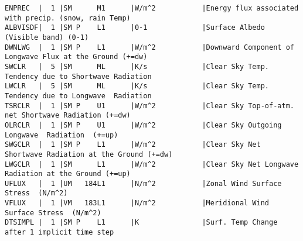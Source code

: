 {\begin{verbatim}
ENPREC  |  1 |SM      M1      |W/m^2           |Energy flux associated with precip. (snow, rain Temp)
ALBVISDF|  1 |SM P    L1      |0-1             |Surface Albedo (Visible band) (0-1)
DWNLWG  |  1 |SM P    L1      |W/m^2           |Downward Component of Longwave Flux at the Ground (+=dw)
SWCLR   |  5 |SM      ML      |K/s             |Clear Sky Temp. Tendency due to Shortwave Radiation
LWCLR   |  5 |SM      ML      |K/s             |Clear Sky Temp. Tendency due to Longwave  Radiation
TSRCLR  |  1 |SM P    U1      |W/m^2           |Clear Sky Top-of-atm. net Shortwave Radiation (+=dw)
OLRCLR  |  1 |SM P    U1      |W/m^2           |Clear Sky Outgoing Longwave  Radiation  (+=up)
SWGCLR  |  1 |SM P    L1      |W/m^2           |Clear Sky Net Shortwave Radiation at the Ground (+=dw)
LWGCLR  |  1 |SM      L1      |W/m^2           |Clear Sky Net Longwave  Radiation at the Ground (+=up)
UFLUX   |  1 |UM   184L1      |N/m^2           |Zonal Wind Surface Stress  (N/m^2)
VFLUX   |  1 |VM   183L1      |N/m^2           |Meridional Wind Surface Stress  (N/m^2)
DTSIMPL |  1 |SM P    L1      |K               |Surf. Temp Change after 1 implicit time step
\end{verbatim}
}

